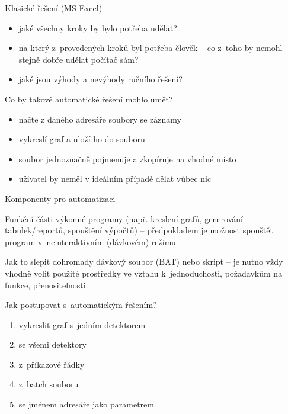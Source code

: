 \documentclass{beamer}
\begin{document}
\begin{frame}{Klasické řešení (MS Excel)}
  \begin{itemize}
    \item jaké všechny kroky by bylo potřeba udělat?
    \item na který z~provedených kroků byl potřeba člověk -- co z~toho by nemohl stejně dobře udělat počítač sám?
    \item jaké jsou výhody a nevýhody ručního řešení?
  \end{itemize}
\end{frame}

\begin{frame}{Co by takové automatické řešení mohlo umět?}
  \begin{itemize}
    \item načte z daného adresáře soubory se záznamy
    \item vykreslí graf a uloží ho do souboru
    \item soubor jednoznačně pojmenuje a zkopíruje na vhodné místo
    \item uživatel by neměl v ideálním případě dělat vůbec nic
  \end{itemize}
\end{frame}

\begin{frame}{Komponenty pro automatizaci}
  \begin{block}{Funkční části}
    výkonné programy (např. kreslení grafů, generování tabulek/reportů, spouštění výpočtů) -- předpokladem je možnost spouštět program v~neinteraktivním (dávkovém) režimu
  \end{block}
  \pause
  \begin{block}{Jak to slepit dohromady}
    dávkový soubor (BAT) nebo skript -- je nutno vždy vhodně volit použité prostředky ve vztahu k~jednoduchosti, požadavkům na funkce, přenositelnosti
  \end{block}
\end{frame}

\begin{frame}{Jak postupovat s~automatickým řešením?}
  \begin{enumerate}
    \item vykreslit graf s~jedním detektorem
    \pause
    \item se všemi detektory
    \pause
    \item z~příkazové řádky
    \pause
    \item z~batch souboru
    \pause
    \item se jménem adresáře jako parametrem
  \end{enumerate}
\end{frame}
\end{document}
